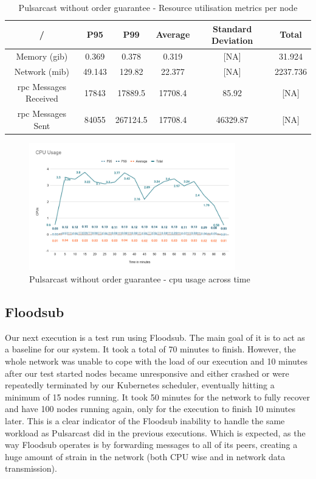 \begin{table}[!htb]
\caption{Pulsarcast without order guarantee - Resource utilisation metrics per node}
\label{table:pulsarcast}
  \begin{center}
   \begin{tabular}{|c| c c c c c|} 
   \hline
   / & P95 & P99 & Average & Standard Deviation & Total \\ [0.5ex] 
   \hline\hline
   Memory (\acrshort{gib}) & 0.369 & 0.378 & 0.319 & [NA] & 31.924 \\
   \hline
   Network (\acrshort{mib}) & 49.143 & 129.82 & 22.377 & [NA] & 2237.736 \\
   \hline
   \acrshort{rpc} Messages Received & 17843 & 17889.5 & 17708.4 & 85.92 & [NA] \\
   \hline
   \acrshort{rpc} Messages Sent & 84055 & 267124.5 & 17708.4 & 46329.87 & [NA] \\ [1ex] 
   \hline
  \end{tabular}
  \end{center}
\end{table}

\begin{figure}[!htb]
  \centering
  \includegraphics[width=0.8\textwidth]{img/graph-pulsarcast-cpu.png}
  \caption{Pulsarcast without order guarantee - \acrshort{cpu} usage across time}
  \label{fig:graph-pulsarcast-cpu}
\end{figure}

\subsection{Floodsub}\label{subsec:floodsub}

Our next execution is a test run using Floodsub. The main goal of it is to act
as a baseline for our system. It took a total of 70 minutes to finish. However,
the whole network was unable to cope with the load of our execution and 10
minutes after our test started nodes became unresponsive and either crashed or
were repeatedly terminated by our Kubernetes scheduler, eventually hitting a
minimum of 15 nodes running. It took 50 minutes for the network to fully
recover and have 100 nodes running again, only for the execution to finish 10
minutes later. This is a clear indicator of the Floodsub inability to handle
the same workload as Pulsarcast did in the previous executions. Which is
expected, as the way Floodsub operates is by forwarding messages to all of its
peers, creating a huge amount of strain in the network (both CPU wise and in
network data transmission).

